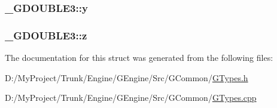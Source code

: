 \subsubsection[{y}]{ \+\_\+\+G\+D\+O\+U\+B\+L\+E3\+::y}\label{struct___g_d_o_u_b_l_e3_afe5e26ac1af98b8db79879d59e6c8921}
\hypertarget{struct___g_d_o_u_b_l_e3_a6df02e180c581059e7eed34f72ac3e34}{}
\subsubsection[{z}]{ \+\_\+\+G\+D\+O\+U\+B\+L\+E3\+::z}\label{struct___g_d_o_u_b_l_e3_a6df02e180c581059e7eed34f72ac3e34}


The documentation for this struct was generated from the following files\+:\begin{DoxyCompactItemize}
\item 
D\+:/\+My\+Project/\+Trunk/\+Engine/\+G\+Engine/\+Src/\+G\+Common/\hyperlink{_g_types_8h}{G\+Types.\+h}\item 
D\+:/\+My\+Project/\+Trunk/\+Engine/\+G\+Engine/\+Src/\+G\+Common/\hyperlink{_g_types_8cpp}{G\+Types.\+cpp}\end{DoxyCompactItemize}
